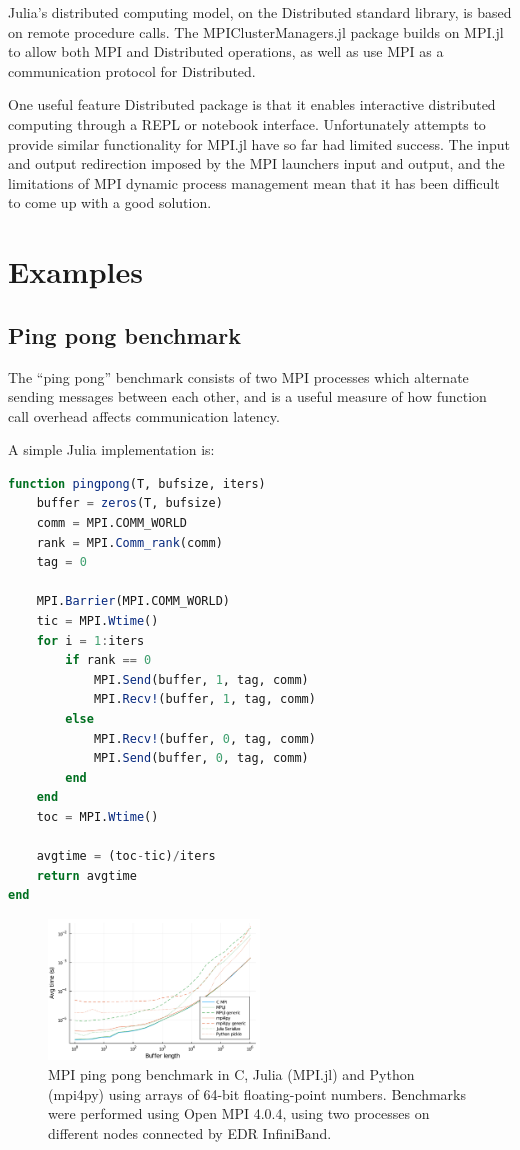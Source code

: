 \documentclass{juliacon}
\begin{document}
Julia's distributed computing model, on the Distributed standard library, is based on
remote procedure calls. The MPIClusterManagers.jl package builds on MPI.jl to allow both
MPI and Distributed operations, as well as use MPI as a communication protocol for
Distributed.

One useful feature Distributed package is that it enables interactive distributed
computing through a REPL or notebook interface. Unfortunately attempts to provide similar
functionality for MPI.jl have so far had limited success. The input and output redirection
imposed by the MPI launchers input and output, and the limitations of MPI dynamic process
management mean that it has been difficult to come up with a good solution.

\section{Examples}
\label{sec:examples}

\subsection{Ping pong benchmark}
\label{sec:ping-pong-benchmark}

The ``ping pong'' benchmark consists of two MPI processes which
alternate sending messages between each other, and is a useful measure
of how function call overhead affects communication latency.

A simple Julia implementation is:
\begin{lstlisting}[language = Julia]
function pingpong(T, bufsize, iters)
    buffer = zeros(T, bufsize)
    comm = MPI.COMM_WORLD
    rank = MPI.Comm_rank(comm)
    tag = 0

    MPI.Barrier(MPI.COMM_WORLD)
    tic = MPI.Wtime()
    for i = 1:iters
        if rank == 0
            MPI.Send(buffer, 1, tag, comm)
            MPI.Recv!(buffer, 1, tag, comm)
        else
            MPI.Recv!(buffer, 0, tag, comm)
            MPI.Send(buffer, 0, tag, comm)
        end
    end
    toc = MPI.Wtime()

    avgtime = (toc-tic)/iters
    return avgtime
end
\end{lstlisting}


\begin{figure}[t]
\centerline{\includegraphics[width=0.5\textwidth]{pingpong.pdf}}
\caption{MPI ping pong benchmark in C, Julia (MPI.jl) and Python
(mpi4py) using arrays of 64-bit floating-point numbers. Benchmarks were
performed using Open MPI 4.0.4, using two processes on different nodes
connected by EDR InfiniBand.\label{fig:pingpong}}
\end{figure}
\end{document}
